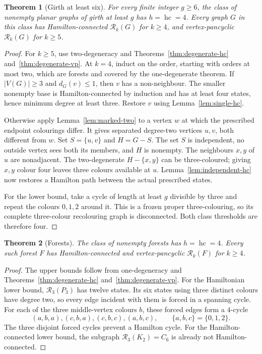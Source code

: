 \documentclass[11pt]{article}
\newtheorem{theorem}{Theorem}[section]
\theoremstyle{remark}
\newcommand{\R}{\mathcal R}
\newcommand{\Rk}{\mathcal R_k}
\newcommand{\hc}{\operatorname{hc}}
\numberwithin{equation}{section}
\numberwithin{table}{section}
\begin{document}
\begin{theorem}[Girth at least six]
\label{thm:girth6-hc}
For every finite integer $g\ge6$, the class of nonempty planar graphs
of girth at least $g$ has $h=\hc=4$.  Every graph $G$ in this
class has Hamilton-connected $\Rk(G)$ for $k\ge4$, and
vertex-pancyclic $\Rk(G)$ for $k\ge5$.
\end{theorem}

\begin{proof}
For $k\ge5$, use two-degeneracy and
Theorems~\ref{thm:degenerate-hc} and~\ref{thm:degenerate-vp}.
At $k=4$, induct on the order, starting with orders at most two,
which are forests and covered by the one-degenerate theorem.
If $|V(G)|\ge3$ and $d_G(v)\le1$, then $v$ has a non-neighbour.
The smaller nonempty base is Hamilton-connected by induction and has
at least four states, hence minimum degree at least three.  Restore
$v$ using Lemma~\ref{lem:single-hc}.

Otherwise apply Lemma~\ref{lem:marked-two} to a vertex $w$ at which
the prescribed endpoint colourings differ.  It gives separated
degree-two vertices $u,v$, both different from $w$.  Set
$S=\{u,v\}$ and $H=G-S$.  The set $S$ is independent, no outside
vertex sees both its members, and $H$ is nonempty.  The neighbours
$x,y$ of $u$ are nonadjacent.  The two-degenerate $H-\{x,y\}$
can be three-coloured; giving $x,y$ colour four leaves three colours
available at $u$.  Lemma~\ref{lem:independent-hc} now restores a
Hamilton path between the actual prescribed states.

For the lower bound, take a cycle of length at least $g$ divisible by
three and repeat the colours $0,1,2$ around it.  This is a frozen
proper three-colouring, so its complete three-colour recolouring graph
is disconnected.  Both class thresholds are therefore four.
\end{proof}

\begin{theorem}[Forests]
\label{thm:forest-hc}
The class of nonempty forests has $h=\hc=4$.  Every such forest
$F$ has Hamilton-connected and vertex-pancyclic $\Rk(F)$ for
$k\ge4$.
\end{theorem}

\begin{proof}
The upper bounds follow from one-degeneracy and
Theorems~\ref{thm:degenerate-hc} and~\ref{thm:degenerate-vp}.
For the Hamiltonian lower bound, $\R_3(P_3)$ has twelve
states.  Its six states using three distinct colours have degree two,
so every edge incident with them is forced in a spanning cycle.
For each of the three middle-vertex colours $b$, these forced edges
form a $4$-cycle
\[
 (a,b,a),(c,b,a),(c,b,c),(a,b,c),
 \qquad \{a,b,c\}=\{0,1,2\}.
\]
The three disjoint forced cycles prevent a Hamilton cycle.  For the
Hamilton-connected lower bound, the subgraph $\R_3(K_2)=C_6$
is already not Hamilton-connected.
\end{proof}
\end{document}
